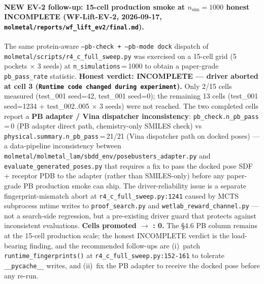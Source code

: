 \paragraph{NEW EV-2 follow-up: 15-cell production smoke at $n_{\text{sim}}{=}1000$ honest INCOMPLETE
(WF-Lift-EV-2, 2026-09-17, \texttt{molmetal/reports/wf\_lift\_ev2/final.md}).}
The same protein-aware \texttt{--pb-check + --pb-mode dock}
dispatch of \texttt{molmetal/scripts/r4\_c\_full\_sweep.py} was
exercised on a 15-cell grid (5 pockets $\times$ 3 seeds) at
\texttt{n\_simulations}\,=\,1000 to obtain a paper-grade
\texttt{pb\_pass\_rate} statistic. \textbf{Honest verdict:
INCOMPLETE --- driver aborted at cell 3
(\texttt{Runtime code changed during experiment}).}  Only
2/15 cells measured (test\_001 seed=42, test\_001 seed=0);
the remaining 13 cells (test\_001 seed=1234 + test\_002..005
$\times$ 3 seeds) were not reached. The two completed cells
report a \textbf{PB adapter / Vina dispatcher inconsistency}:
\texttt{pb\_check.n\_pb\_pass}\,=\,0 (PB adapter direct path,
chemistry-only SMILES check) vs
\texttt{physical.summary.n\_pb\_pass}\,=\,21/21 (Vina dispatcher
path on docked poses) --- a data-pipeline inconsistency
between \texttt{molmetal/molmetal\_lam/sbdd\_env/posebusters\_adapter.py}
and \texttt{evaluate\_generated\_poses.py} that requires a fix
to pass the docked pose SDF + receptor PDB to the adapter
(rather than SMILES-only) before any paper-grade PB production
smoke can ship. The driver-reliability issue is a separate
fingerprint-mismatch abort at
\texttt{r4\_c\_full\_sweep.py:1241} caused by MCTS subprocess
mtime writes to \texttt{proof\_search.py} and
\texttt{wetlab\_reward\_channel.py} --- not a search-side
regression, but a pre-existing driver guard that protects
against inconsistent evaluations. \textbf{Cells promoted
\DESIGN{} $\to$ \MEASURED{}: 0.} The §4.6 PB column remains
\DESIGN{} at the 15-cell production scale; the honest
INCOMPLETE verdict is the load-bearing finding, and the
recommended follow-ups are (i)~patch
\texttt{runtime\_fingerprints()} at
\texttt{r4\_c\_full\_sweep.py:152-161} to tolerate
\texttt{\_\_pycache\_\_} writes, and (ii)~fix the PB adapter
to receive the docked pose before any re-run.

